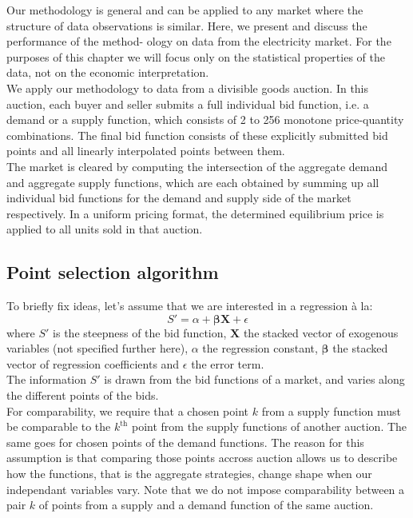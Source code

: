 Our methodology is general and can be applied to any market where the structure of data observations is similar. Here, we present and discuss the performance of the method- ology on data from the electricity market. For the purposes of this chapter we will focus only on the statistical properties of the data, not on the economic interpretation.\\

We apply our methodology to data from a divisible goods auction. In this auction, each buyer and seller submits a full individual bid function, i.e. a demand or a supply function, which consists of 2 to 256 monotone price-quantity combinations. The final bid function consists of these explicitly submitted bid points and all linearly interpolated points between them.\\

The market is cleared by computing the intersection of the aggregate demand and aggregate supply functions, which are each obtained by summing up all individual bid functions for the demand and supply side of the market respectively. In a uniform pricing format, the determined equilibrium price is applied to all units sold in that auction.


\subsection{Point selection algorithm}\label{pointselect}

To briefly fix ideas, let's assume that we are interested in a regression \`{a} la: 
$$ S' = \alpha + \boldsymbol{\beta  X} + \epsilon$$
where $S'$ is the steepness of the bid function, $\boldsymbol{X}$ the stacked vector of exogenous variables (not specified further here), $\alpha$ the regression constant, $\boldsymbol{\beta}$ the stacked vector of regression coefficients and $\epsilon$ the error term. \\

The information $S'$ is drawn from the bid functions of a %
market, and varies along the different points of the bids.\\

For comparability, we require that a chosen point $k$ from a supply function must be comparable to the $k^\text{th}$ point from the supply functions of another auction. The same goes for chosen points of the demand functions. The reason for this assumption is that comparing those points accross auction allows us to describe how the functions, that is the aggregate strategies, change shape when our independant variables vary. Note that we do not impose comparability between a pair $k$ of points from a supply and a demand function of the same auction. 

